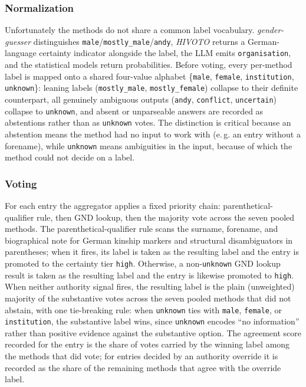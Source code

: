 \documentclass{eceasst}
\newcommand{\eg}{e.\,g.}
\begin{document}
\subsubsection{Normalization} Unfortunately the methods do not share a common label vocabulary. \textit{gender-guesser} distinguishes \texttt{male}/\texttt{mostly\_male}/\texttt{andy}, \textit{HIVOTO} returns a German-language certainty indicator alongside the label, the LLM emits \texttt{organisation}, and the statistical models return probabilities. Before voting, every per-method label is mapped onto a shared four-value alphabet \{\texttt{male}, \texttt{female}, \texttt{institution}, \texttt{unknown}\}: leaning labels (\texttt{mostly\_male}, \texttt{mostly\-\_female}) collapse to their definite counterpart, all genuinely ambiguous outputs (\texttt{andy}, \texttt{con\-flict}, \texttt{uncertain}) collapse to \texttt{unknown}, and absent or unparseable answers are recorded as abstentions rather than as \texttt{unknown} votes. The distinction is critical because an abstention means the method had no input to work with (\eg{} an entry without a forename), while \texttt{unknown} means ambiguities in the input, because of which the method could not decide on a label.


\subsubsection{Voting} For each entry the aggregator applies a fixed priority chain: parenthetical-qualifier rule, then GND lookup, then the majority vote across the seven pooled methods. The parenthetical-qualifier rule scans the surname, forename, and biographical note for German kinship markers and structural disambiguators in parentheses; when it fires, its label is taken as the resulting label and the entry is promoted to the certainty tier \texttt{high}. Otherwise, a non-\texttt{unknown} GND lookup result is taken as the resulting label and the entry is likewise promoted to \texttt{high}. When neither authority signal fires, the resulting label is the plain (unweighted) majority of the substantive votes across the seven pooled methods that did not abstain, with one tie-breaking rule: when \texttt{unknown} ties with \texttt{male}, \texttt{female}, or \texttt{institution}, the substantive label wins, since \texttt{unknown} encodes ``no information'' rather than positive evidence against the substantive option. The agreement score recorded for the entry is the share of votes carried by the winning label among the methods that did vote; for entries decided by an authority override it is recorded as the share of the remaining methods that agree with the override label.
\end{document}
